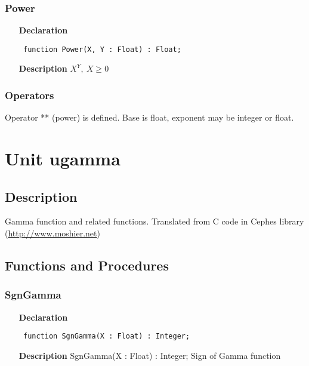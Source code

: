 \documentclass[12pt,a4paper,oneside]{report}
\newcommand{\lmath}[1]{   %
	\marginpar{\vspace{#1} 
		\begin{flushright}
			LMath
	\end{flushright} }
}
\newcommand{\declarationitem}[1]{\textbf{#1}}
\newcommand{\descriptiontitle}[1]{\textbf{#1}}
\newcommand{\code}[1]{\texttt{#1}}
\begin{document}
\subsubsection{Power}
\label{umath-Power}
\begin{itemize}\item[\declarationitem{Declaration}\hfill]
	\begin{flushleft}
		\code{
			function Power(X, Y : Float) : Float;}
		
	\end{flushleft}
	
	\par
	\item[\descriptiontitle{Description}]
	$X^Y,\ X\ge 0$
	
\end{itemize}
\subsubsection{Operators}
Operator ** (power) is defined. Base is float, exponent may be integer or float. \lmath{-12pt}
\section{Unit ugamma}
\label{ugamma}
\subsection{Description}
Gamma function and related functions. Translated from C code in Cephes library (\href{http://www.moshier.net}{http://www.moshier.net}) \subsection{Functions and Procedures}
\subsubsection{SgnGamma}
\label{ugamma-SgnGamma}
\begin{itemize}\item[\declarationitem{Declaration}\hfill]
	\begin{flushleft}
		\code{
			function SgnGamma(X : Float) : Integer;}
		
	\end{flushleft}
	
	\par
	\item[\descriptiontitle{Description}]
	SgnGamma(X : Float) : Integer; Sign of Gamma function
	
\end{itemize}
\end{document}
